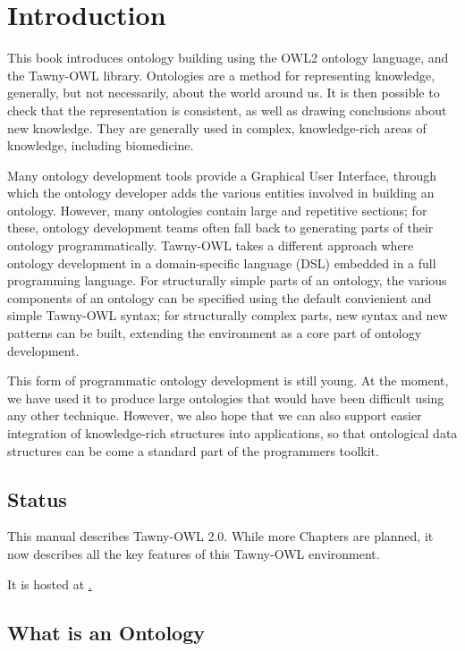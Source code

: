 \chapter{Introduction}
\label{cha:introduction}

This book introduces ontology building using the OWL2 ontology language, and
the Tawny-OWL library. Ontologies are a method for representing knowledge,
generally, but not necessarily, about the world around us. It is then possible
to check that the representation is consistent, as well as drawing conclusions
about new knowledge. They are generally used in complex, knowledge-rich areas
of knowledge, including biomedicine.

Many ontology development tools provide a Graphical User Interface, through
which the ontology developer adds the various entities involved in building an
ontology. However, many ontologies contain large and repetitive sections; for
these, ontology development teams often fall back to generating parts of their
ontology programmatically. Tawny-OWL takes a different approach where ontology
development in a domain-specific language (DSL) embedded in a full programming
language. For structurally simple parts of an ontology, the various components
of an ontology can be specified using the default convienient and simple
Tawny-OWL syntax; for structurally complex parts, new syntax and new patterns
can be built, extending the environment as a core part of ontology
development.

This form of programmatic ontology development is still young. At the moment,
we have used it to produce large ontologies that would have been difficult
using any other technique. However, we also hope that we can also support
easier integration of knowledge-rich structures into applications, so that
ontological data structures can be come a standard part of the programmers
toolkit.


\section{Status}
\label{sec:status}

This manual describes Tawny-OWL 2.0. While more Chapters are planned,
it now describes all the key features of this Tawny-OWL environment.

It is hosted at \href{https://phillord.github.io/take-wing/}.



\section{What is an Ontology}
\label{sec:what-an-ontology}

